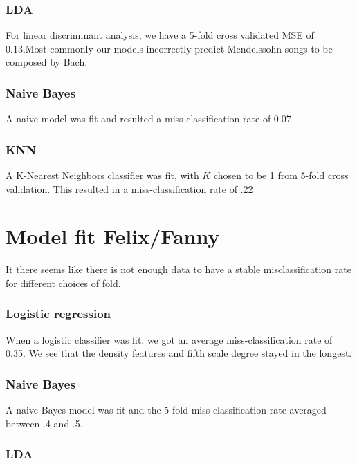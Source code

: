 \documentclass[12pt,twoside]{reedthesis}
\theoremstyle{definition}
\theoremstyle{definition}
\theoremstyle{definition}
\theoremstyle{remark}
\begin{document}
\subsubsection{LDA}\label{lda}

For linear discriminant analysis, we have a 5-fold cross validated MSE
of 0.13.Most commonly our models incorrectly predict Mendelssohn songs
to be composed by Bach.

\subsubsection{Naive Bayes}\label{naive-bayes-1}

A naive model was fit and resulted a miss-classification rate of 0.07

\subsubsection{KNN}\label{knn}

A K-Nearest Neighbors classifier was fit, with \(K\) chosen to be 1 from
5-fold cross validation. This resulted in a miss-classification rate of
.22

\section{Model fit Felix/Fanny}\label{model-fit-felixfanny}

It there seems like there is not enough data to have a stable
misclassification rate for different choices of fold.

\subsubsection{Logistic regression}\label{logistic-regression-2}

When a logistic classifier was fit, we got an average
miss-classification rate of 0.35. We see that the density features and
fifth scale degree stayed in the longest.

\subsubsection{Naive Bayes}\label{naive-bayes-2}

A naive Bayes model was fit and the 5-fold miss-classification rate
averaged between .4 and .5.

\subsubsection{LDA}\label{lda-1}
\end{document}
